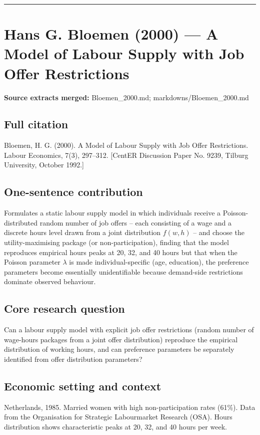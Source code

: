 \documentclass[11pt,a4paper]{article}
\begin{document}
\medskip\hrule\medskip

\section*{Hans G. Bloemen (2000) — A Model of Labour Supply with Job Offer Restrictions}

\textbf{Source extracts merged:} Bloemen\_2000.md; markdowns/Bloemen\_2000.md

\subsection*{Full citation}
Bloemen, H. G. (2000). A Model of Labour Supply with Job Offer Restrictions. Labour Economics, 7(3), 297--312. [CentER Discussion Paper No. 9239, Tilburg University, October 1992.]

\subsection*{One-sentence contribution}
Formulates a static labour supply model in which individuals receive a Poisson-distributed random number of job offers -- each consisting of a wage and a discrete hours level drawn from a joint distribution $f(w, h)$ -- and choose the utility-maximising package (or non-participation), finding that the model reproduces empirical hours peaks at 20, 32, and 40 hours but that when the Poisson parameter $\lambda$ is made individual-specific (age, education), the preference parameters become essentially unidentifiable because demand-side restrictions dominate observed behaviour.

\subsection*{Core research question}
Can a labour supply model with explicit job offer restrictions (random number of wage-hours packages from a joint offer distribution) reproduce the empirical distribution of working hours, and can preference parameters be separately identified from offer distribution parameters?

\subsection*{Economic setting and context}
Netherlands, 1985. Married women with high non-participation rates (61\%). Data from the Organisation for Strategic Labourmarket Research (OSA). Hours distribution shows characteristic peaks at 20, 32, and 40 hours per week.
\end{document}
